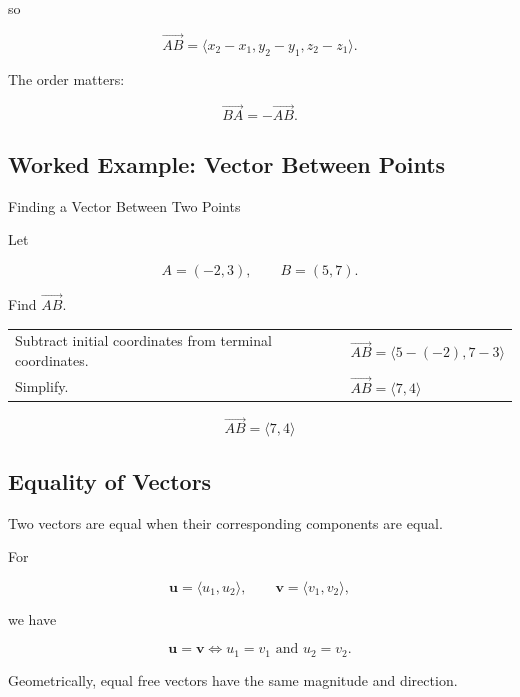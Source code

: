 so

\[
\boxed{
\overrightarrow{AB}
=
\langle
x_2-x_1,
y_2-y_1,
z_2-z_1
\rangle.
}
\]

The order matters:

\[ \overrightarrow{BA}=-\overrightarrow{AB}. \]

\subsection{Worked Example: Vector Between Points}
\label{subsec:worked-vector-between-points}

\begin{workedexamplebox}{Finding a Vector Between Two Points}

Let

\[ A=(-2,3),\qquad B=(5,7). \]

Find \(\overrightarrow{AB}\).

\begin{tabularx}{\textwidth}{@{}>{\raggedright\arraybackslash}p{}X@{}}
Subtract initial coordinates from terminal coordinates. &
\(\overrightarrow{AB}=\langle5-(-2),7-3\rangle\)\\
Simplify. &
\(\overrightarrow{AB}=\langle7,4\rangle\)
\end{tabularx}

\begin{answerbox}
\[ \boxed{\overrightarrow{AB}=\langle7,4\rangle} \]
\end{answerbox}
\end{workedexamplebox}

\subsection{Equality of Vectors}
\label{subsec:equality-of-vectors}

Two vectors are equal when their corresponding components are equal.

For

\[
\mathbf{u}=\langle u_1,u_2\rangle,\qquad
\mathbf{v}=\langle v_1,v_2\rangle,
\]

we have

\[
\boxed{
\mathbf{u}=\mathbf{v}
\iff
u_1=v_1
\text{ and }
u_2=v_2.
}
\]

Geometrically, equal free vectors have the same magnitude and direction.

